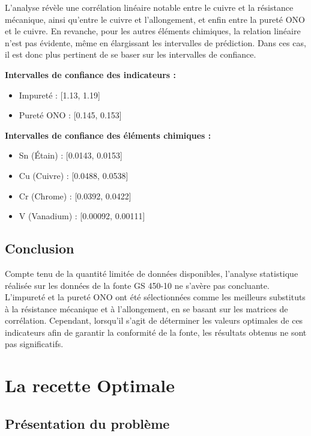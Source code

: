 \documentclass[12pt]{article}
\begin{document}
L'analyse révèle une corrélation linéaire notable entre le cuivre et la 
résistance mécanique, ainsi qu'entre le cuivre et l'allongement, et enfin 
entre la pureté ONO et le cuivre. En revanche, pour les autres éléments 
chimiques, la relation linéaire n'est pas évidente, même en élargissant 
les intervalles de prédiction. Dans ces cas, il est donc plus pertinent 
de se baser sur les intervalles de confiance.

\textbf{Intervalles de confiance des indicateurs :}
\begin{itemize}
\item Impureté : [1.13, 1.19]
\item Pureté ONO : [0.145, 0.153]
\end{itemize}

\textbf{Intervalles de confiance des éléments chimiques :}
\begin{itemize}
\item Sn (Étain) : [0.0143, 0.0153]
\item Cu (Cuivre) : [0.0488, 0.0538]
\item Cr (Chrome) : [0.0392, 0.0422]
\item V (Vanadium) : [0.00092, 0.00111]
\end{itemize}





\subsection*{Conclusion}

Compte tenu de la quantité limitée de données disponibles, l'analyse 
statistique réalisée sur les données de la fonte GS 450-10 ne s'avère 
pas concluante. L'impureté et la pureté ONO ont été sélectionnées comme 
les meilleurs substituts à la résistance mécanique et à l'allongement, 
en se basant sur les matrices de corrélation. Cependant, lorsqu'il s'agit 
de déterminer les valeurs optimales de ces indicateurs afin de garantir 
la conformité de la fonte, les résultats obtenus ne sont pas significatifs.





\section{La recette Optimale}

\subsection{Présentation du problème}
\end{document}
